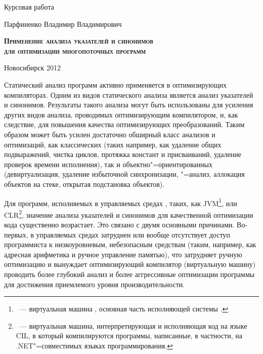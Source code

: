 \documentclass[14pt,titlepage,draft]{extarticle}
\newcommand{\java}{\eng{Java}\xspace}
\begin{document}
\begin{center}
{      Курсовая работа

      \vspace{0.5cm}

      {\large Парфиненко Владимир Владимирович}

      \vspace{1.1cm}

      {\large \scshape \bfseries
        Применение анализа указателей и синонимов\\
        для оптимизации многопоточных программ
      }

      \vspace{2.5cm}


      \hfill{}

      \vfill

      Новосибирск 2012
    }
  \end{center}

  \listoftodos

  \tableofcontents


    Статический анализ программ активно применяется в оптимизирующих
    компиляторах. Одним из видов статического анализа является анализ
    указателей и синонимов. Результаты такого анализа могут быть использованы
    для усиления других видов анализа, проводимых оптимизирующим компилятором,
    и, как следствие, для повышения качества оптимизирующих преобразований.
    Таким образом может быть усилен достаточно обширный класс анализов и
    оптимизаций, как классических (таких например, как удаление общих
    подвыражений, чистка циклов, протяжка констант и присваиваний, удаление
    проверок времени исполнения), так и объектно"=ориентированных
    (девиртуализация, удаление избыточной синхронизации, "=анализ,
    аллокация объектов на стеке, открытая подстановка объектов).

    Для программ, исполняемых в управляемых средах , таких, как JVM\footnote{~---
    виртуальная машина \java, основная часть исполняющей системы \java.}, или
    CLR\footnote{~--- виртуальная машина,
    интерпретирующая и исполняющая код на языке CIL, в который компилируются
    программы, написанные, в частности, на .NET"=совместимых языках
    программирования.}, значение анализа указателей и синонимов для
    качественной оптимизации кода существенно возрастает. Это связано с двумя
    основными причинами. Во-первых, в управляемых средах затруднен или вообще
    отсутствует доступ программиста к низкоуровневым, небезопасным средствам
    (таким, например, как адресная арифметика и ручное управление памятью), что
    затрудняет ручную оптимизацию и вынуждает оптимизирующий компилятор
    (виртуальную машину) проводить более глубокий анализ и более аггрессивные
    оптимизации программы для достижения приемлемого уровня производительности.
\end{document}
